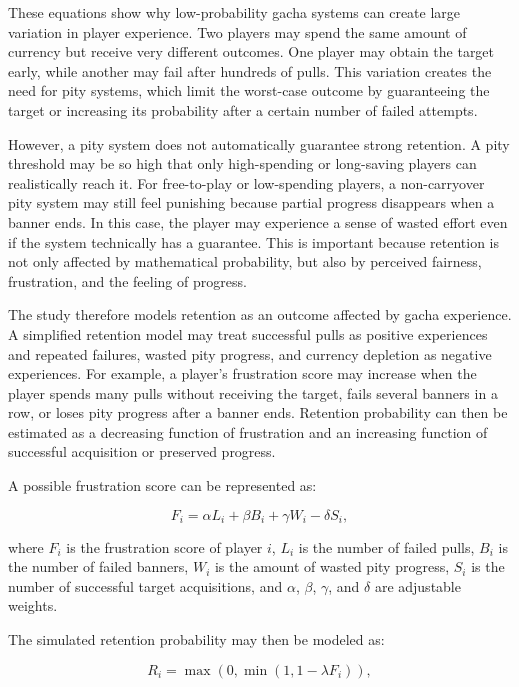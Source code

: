 \documentclass[sigconf,nonacm]{acmart}
\begin{document}
These equations show why low-probability gacha systems can create large variation in player experience. Two players may spend the same amount of currency but receive very different outcomes. One player may obtain the target early, while another may fail after hundreds of pulls. This variation creates the need for pity systems, which limit the worst-case outcome by guaranteeing the target or increasing its probability after a certain number of failed attempts.

However, a pity system does not automatically guarantee strong retention. A pity threshold may be so high that only high-spending or long-saving players can realistically reach it. For free-to-play or low-spending players, a non-carryover pity system may still feel punishing because partial progress disappears when a banner ends. In this case, the player may experience a sense of wasted effort even if the system technically has a guarantee. This is important because retention is not only affected by mathematical probability, but also by perceived fairness, frustration, and the feeling of progress.

The study therefore models retention as an outcome affected by gacha experience. A simplified retention model may treat successful pulls as positive experiences and repeated failures, wasted pity progress, and currency depletion as negative experiences. For example, a player's frustration score may increase when the player spends many pulls without receiving the target, fails several banners in a row, or loses pity progress after a banner ends. Retention probability can then be estimated as a decreasing function of frustration and an increasing function of successful acquisition or preserved progress.

A possible frustration score can be represented as:

\begin{equation}
F_i = \alpha L_i + \beta B_i + \gamma W_i - \delta S_i,
\label{eq:frustration}
\end{equation}

where $F_i$ is the frustration score of player $i$, $L_i$ is the number of failed pulls, $B_i$ is the number of failed banners, $W_i$ is the amount of wasted pity progress, $S_i$ is the number of successful target acquisitions, and $\alpha$, $\beta$, $\gamma$, and $\delta$ are adjustable weights.

The simulated retention probability may then be modeled as:

\begin{equation}
R_i = \max(0, \min(1, 1 - \lambda F_i)),
\label{eq:retention}
\end{equation}
\end{document}
